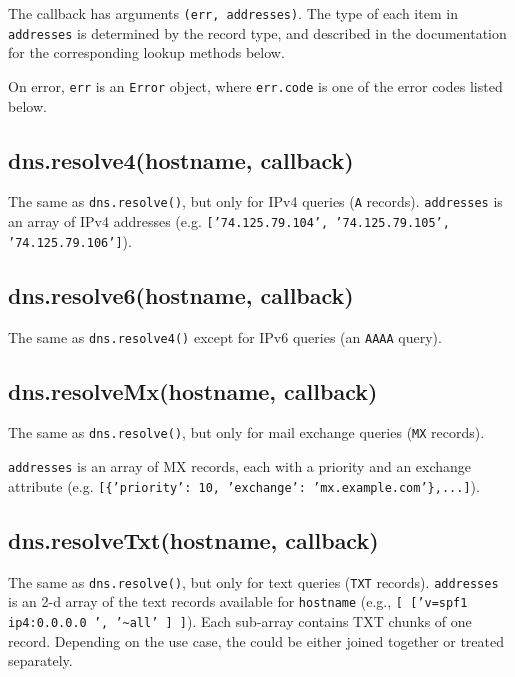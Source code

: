 The callback has arguments \texttt{(err, addresses)}. The type of each
item in \texttt{addresses} is determined by the record type, and
described in the documentation for the corresponding lookup methods
below.

On error, \texttt{err} is an \texttt{Error} object, where
\texttt{err.code} is one of the error codes listed below.

\subsection{dns.resolve4(hostname,
callback)}\label{dns.resolve4hostname-callback}

The same as \texttt{dns.resolve()}, but only for IPv4 queries
(\texttt{A} records). \texttt{addresses} is an array of IPv4 addresses
(e.g. \texttt{{[}'74.125.79.104', '74.125.79.105', '74.125.79.106'{]}}).

\subsection{dns.resolve6(hostname,
callback)}\label{dns.resolve6hostname-callback}

The same as \texttt{dns.resolve4()} except for IPv6 queries (an
\texttt{AAAA} query).

\subsection{dns.resolveMx(hostname,
callback)}\label{dns.resolvemxhostname-callback}

The same as \texttt{dns.resolve()}, but only for mail exchange queries
(\texttt{MX} records).

\texttt{addresses} is an array of MX records, each with a priority and
an exchange attribute (e.g.
\texttt{{[}\{'priority': 10, 'exchange': 'mx.example.com'\},...{]}}).

\subsection{dns.resolveTxt(hostname,
callback)}\label{dns.resolvetxthostname-callback}

The same as \texttt{dns.resolve()}, but only for text queries
(\texttt{TXT} records). \texttt{addresses} is an 2-d array of the text
records available for \texttt{hostname} (e.g.,
\texttt{{[} {[}'v=spf1 ip4:0.0.0.0 ', '\textasciitilde{}all' {]} {]}}).
Each sub-array contains TXT chunks of one record. Depending on the use
case, the could be either joined together or treated separately.

